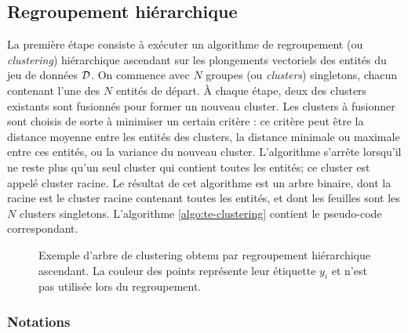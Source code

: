 

\subsection{Regroupement hiérarchique}
\label{subsec:te-clustering}

La première étape consiste à exécuter un algorithme de regroupement (ou \textit{clustering}) hiérarchique ascendant sur les plongements vectoriels des entités du jeu de données $\cal{D}$. %
On commence avec $N$ groupes (ou \textit{clusters}) singletons, chacun contenant l'une des $N$ entités de départ. À chaque étape, deux des clusters existants sont fusionnés pour former un nouveau cluster. Les clusters à fusionner sont choisis de sorte à minimiser un certain critère : ce critère peut être la distance moyenne entre les entités des clusters, la distance minimale ou maximale entre ces entités, ou la variance du nouveau cluster. 
L'algorithme s'arrête lorsqu'il ne reste plus qu'un seul cluster qui contient toutes les entités; ce cluster est appelé cluster racine. Le résultat de cet algorithme est un arbre binaire, dont la racine est le cluster racine contenant toutes les entités, et dont les feuilles sont les $N$ clusters singletons. L'algorithme \ref{algo:te-clustering} contient le pseudo-code correspondant.

\begin{figure}[h]
    \centering
    \begin{adjustwidth}{0in}{-0.5in}
        \resizebox{1.1\textwidth}{!}{%
            
        }%
    \end{adjustwidth}
    \caption[Principe du regroupement hiérarchique ascendant]{Exemple d'arbre de clustering obtenu par regroupement hiérarchique ascendant. La couleur des points représente leur étiquette $y_i$ et n'est pas utilisée lors du regroupement.}
    \label{fig:clustering_tree}
\end{figure}

\subsubsection{Notations}

